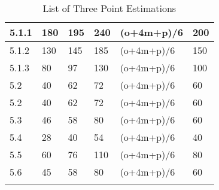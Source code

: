 \begin{longtable}[H]{C{1.5cm} C{2cm} C{2cm} C{2cm} C{3cm} C{2cm} }
		5.1.1 & 180 & 195 & 240 & (o+4m+p)/6 & 200\\ \midrule
		
		5.1.2 & 130 & 145 & 185 & (o+4m+p)/6 & 150\\
		
		5.1.3 & 80 & 97 & 130 & (o+4m+p)/6 & 100\\
		
		5.2 & 40 & 62 & 72 & (o+4m+p)/6 & 60\\
		
		5.2 & 40 & 62 & 72 & (o+4m+p)/6 & 60\\
		
		5.3 & 46 & 58 & 80 & (o+4m+p)/6 & 60\\		
		
		5.4 & 28 & 40 & 54 & (o+4m+p)/6 & 40\\
		
		5.5 & 60 & 76 & 110 & (o+4m+p)/6 & 80\\
		
		5.6 & 45 & 58 & 80 & (o+4m+p)/6 & 60\\
		
    \bottomrule[2pt]
	\caption{List of Three Point Estimations}

\end{longtable}
	
	